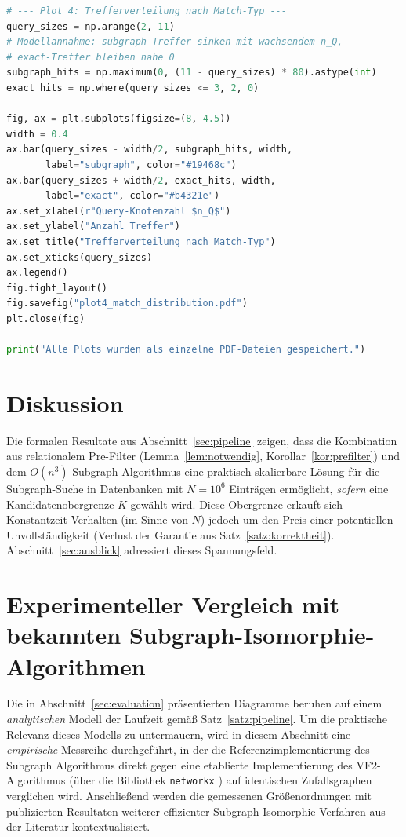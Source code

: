 \documentclass[a4paper,12pt]{article}
\theoremstyle{definition}
\begin{document}
\begin{lstlisting}[language=Python, caption=Generierung aller vier Diagramme als einzelne PDFs]
# --- Plot 4: Trefferverteilung nach Match-Typ ---
query_sizes = np.arange(2, 11)
# Modellannahme: subgraph-Treffer sinken mit wachsendem n_Q,
# exact-Treffer bleiben nahe 0
subgraph_hits = np.maximum(0, (11 - query_sizes) * 80).astype(int)
exact_hits = np.where(query_sizes <= 3, 2, 0)

fig, ax = plt.subplots(figsize=(8, 4.5))
width = 0.4
ax.bar(query_sizes - width/2, subgraph_hits, width,
       label="subgraph", color="#19468c")
ax.bar(query_sizes + width/2, exact_hits, width,
       label="exact", color="#b4321e")
ax.set_xlabel(r"Query-Knotenzahl $n_Q$")
ax.set_ylabel("Anzahl Treffer")
ax.set_title("Trefferverteilung nach Match-Typ")
ax.set_xticks(query_sizes)
ax.legend()
fig.tight_layout()
fig.savefig("plot4_match_distribution.pdf")
plt.close(fig)

print("Alle Plots wurden als einzelne PDF-Dateien gespeichert.")
\end{lstlisting}

\section{Diskussion}

Die formalen Resultate aus Abschnitt~\ref{sec:pipeline} zeigen, dass die Kombination aus relationalem Pre-Filter (Lemma~\ref{lem:notwendig}, Korollar~\ref{kor:prefilter}) und dem $O(n^3)$-Subgraph Algorithmus \cite{epp2026subgraph} eine praktisch skalierbare Lösung für die Subgraph-Suche in Datenbanken mit $N=10^6$ Einträgen ermöglicht, \emph{sofern} eine Kandidatenobergrenze $K$ gewählt wird. Diese Obergrenze erkauft sich Konstantzeit-Verhalten (im Sinne von $N$) jedoch um den Preis einer potentiellen Unvollständigkeit (Verlust der Garantie aus Satz~\ref{satz:korrektheit}). Abschnitt~\ref{sec:ausblick} adressiert dieses Spannungsfeld.

\section{Experimenteller Vergleich mit bekannten Subgraph-Isomorphie-Algorithmen}
\label{sec:vergleich}

Die in Abschnitt~\ref{sec:evaluation} präsentierten Diagramme beruhen auf einem \emph{analytischen} Modell der Laufzeit gemäß Satz~\ref{satz:pipeline}. Um die praktische Relevanz dieses Modells zu untermauern, wird in diesem Abschnitt eine \emph{empirische} Messreihe durchgeführt, in der die Referenzimplementierung des Subgraph Algorithmus \cite{epp2026subgraph} direkt gegen eine etablierte Implementierung des VF2-Algorithmus \cite{cordella2004} (über die Bibliothek \texttt{networkx} \cite{networkx}) auf identischen Zufallsgraphen verglichen wird. Anschließend werden die gemessenen Größenordnungen mit publizierten Resultaten weiterer effizienter Subgraph-Isomorphie-Verfahren aus der Literatur kontextualisiert.
\end{document}

